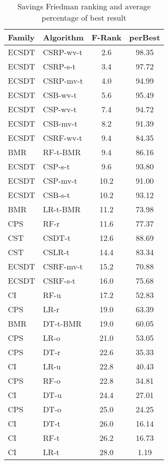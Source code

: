 {  
    \begin{table}[!t]
     \centering
    \footnotesize
    \begin{tabular}{ll c c  } %
      \hline
      \bf{Family} & \bf{Algorithm} & \bf{F-Rank} & \bf{perBest}\\
      \hline
        ECSDT&CSRP-wv-t&2.6&98.35\\ 
        ECSDT&CSRP-s-t&3.4&97.72\\ 
        ECSDT&CSRP-mv-t&4.0&94.99\\ 
        ECSDT&CSB-wv-t&5.6&95.49\\ 
        ECSDT&CSP-wv-t&7.4&94.72\\ 
        ECSDT&CSB-mv-t&8.2&91.39\\ 
        ECSDT&CSRF-wv-t&9.4&84.35\\ 
        BMR&RF-t-BMR&9.4&86.16\\ 
        ECSDT&CSP-s-t&9.6&93.80\\ 
        ECSDT&CSP-mv-t&10.2&91.00\\ 
        ECSDT&CSB-s-t&10.2&93.12\\ 
        BMR&LR-t-BMR&11.2&73.98\\ 
        CPS&RF-r&11.6&77.37\\ 
        CST&CSDT-t&12.6&88.69\\ 
        CST&CSLR-t&14.4&83.34\\ 
        ECSDT&CSRF-mv-t&15.2&70.88\\ 
        ECSDT&CSRF-s-t&16.0&75.68\\ 
        CI&RF-u&17.2&52.83\\ 
        CPS&LR-r&19.0&63.39\\ 
        BMR&DT-t-BMR&19.0&60.05\\ 
        CPS&LR-o&21.0&53.05\\ 
        CPS&DT-r&22.6&35.33\\ 
        CI&LR-u&22.8&40.43\\ 
        CPS&RF-o&22.8&34.81\\ 
        CI&DT-u&24.4&27.01\\ 
        CPS&DT-o&25.0&24.25\\ 
        CI&DT-t&26.0&16.14\\ 
        CI&RF-t&26.2&16.73\\ 
        CI&LR-t&28.0&1.19\\ 
      \hline
    \end{tabular}
    \caption{Savings Friedman ranking and average percentage of best result}
    \label{tab:9:results_ranking}

\end{table}}
